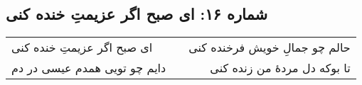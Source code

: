 \begin{center}
\section*{شماره ۱۶: ای صبح اگر عزیمتِ خنده کنی}
\label{sec:016}
\begin{longtable}{l p{0.5cm} r}
ای صبح اگر عزیمتِ خنده کنی
&&
حالم چو جمالِ خویش فرخنده کنی
\\
دایم چو تویی همدم عیسی در دم
&&
تا بوکه دل مردهٔ من زنده کنی
\\
\end{longtable}
\end{center}
